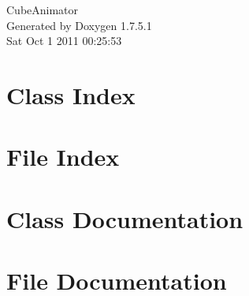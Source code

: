\documentclass[a4paper]{book}
\begin{document}
\hypersetup{pageanchor=false,citecolor=blue}
\begin{titlepage}
\vspace*{7cm}
\begin{center}
{\Large \-Cube\-Animator }\\
\vspace*{1cm}
{\large \-Generated by Doxygen 1.7.5.1}\\
\vspace*{0.5cm}
{\small Sat Oct 1 2011 00:25:53}\\
\end{center}
\end{titlepage}
\clearemptydoublepage
{}
\tableofcontents
\clearemptydoublepage
{}
\hypersetup{pageanchor=true,citecolor=blue}
\chapter{\-Class \-Index}

\chapter{\-File \-Index}

\chapter{\-Class \-Documentation}





























\chapter{\-File \-Documentation}



\printindex
\end{document}

